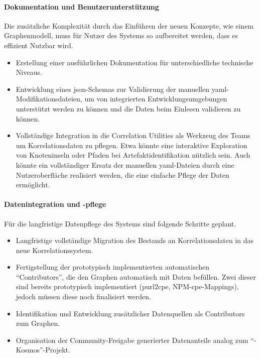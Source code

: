 \paragraph{Dokumentation und Benutzerunterstützung}

Die zusätzliche Komplexität durch das Einführen der neuen Konzepte, wie einem Graphenmodell, muss für Nutzer des Systems so aufbereitet werden, dass es effizient Nutzbar wird.

\begin{itemize}
    \itemsep0em
    \item Erstellung einer ausführlichen Dokumentation für unterschiedliche technische Niveaus.
    \item Entwicklung eines \acrshort{json}-Schemas zur Validierung der manuellen \acrshort{yaml}-Modifikationsdateien, um von integrierten Entwicklungsumgebungen unterstützt werden zu können und die Daten beim Einlesen validieren zu können.
    \item Vollständige Integration in die Correlation Utilities als Werkzeug des Teams um Korrelationsdaten zu pflegen.
    Etwa könnte eine interaktive Exploration von Knoteninseln oder Pfaden bei Artefaktidentifikation nützlich sein.
    Auch könnte ein vollständiger Ersatz der manuellen \acrshort{yaml}-Dateien durch eine Nutzeroberfläche realisiert werden, die eine einfache Pflege der Daten ermöglicht.
\end{itemize}

\paragraph{Datenintegration und -pflege}

Für die langfristige Datenpflege des Systems sind folgende Schritte geplant.

\begin{itemize}
    \itemsep0em
    \item Langfristige vollständige Migration des Bestands an Korrelationsdaten in das neue Korrelationssystem.
    \item Fertigstellung der prototypisch implementierten automatischen \enquote{Contributors}, die den Graphen automatisch mit Daten befüllen.
    Zwei dieser sind bereits prototypisch implementiert (purl2cpe, NPM-\acrshort{cpe}-Mappings), jedoch müssen diese noch finalisiert werden.
    \item Identifikation und Entwicklung zusätzlicher Datenquellen als Contributors zum Graphen.
    \item Organisation der Community-Freigabe generierter Datenanteile analog zum \enquote{\metaeffekt-Kosmos}-Projekt.
\end{itemize}


